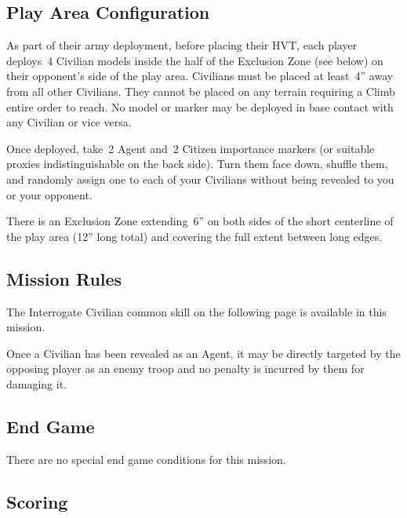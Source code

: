 \label{mission:exfiltrate}

\subsection{Play Area Configuration}

As part of their army deployment, before placing their HVT, each
player deploys~4 Civilian models inside the half of the Exclusion Zone
(see below) on their opponent's side of the play area.  Civilians must
be placed at least~4'' away from all other Civilians.  They cannot be
placed on any terrain requiring a Climb entire order to reach.  No
model or marker may be deployed in base contact with any Civilian or
vice versa.

Once deployed, take~2 Agent and~2 Citizen importance markers (or
suitable proxies indistinguishable on the back side).  Turn them face
down, shuffle them, and randomly assign one to each of your Civilians
without being revealed to you or your opponent.

  There is an Exclusion Zone
extending~6'' on both sides of the short centerline of the play area
(12'' long total) and covering the full extent between long edges.

\subsection{Mission Rules}

The Interrogate Civilian common skill on the following page is
available in this mission.

Once a Civilian has been revealed as an Agent, it may be directly
targeted by the opposing player as an enemy troop and no penalty is
incurred by them for damaging it.


\subsection{End Game}

There are no special end game conditions for this mission.

\subsection{Scoring}

